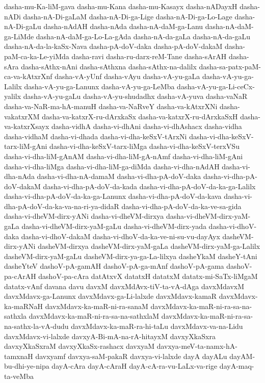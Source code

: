 {dasha-mu-Ka-liM-gava
dasha-mu-Kana
dasha-mu-Kasayx
dasha-nADayxH
dasha-nADi
dasha-nA-Di-gaLaM
dasha-nA-Di-ga-Lige
dasha-nA-Di-ga-Lo-Lage
dasha-nA-Di-gaLu
dasha-nAdAH
dasha-nAda
dasha-nA-daM-ga-Lanu
dasha-nA-daM-ga-LiMde
dasha-nA-daM-ga-Lo-La-gAda
dasha-nA-da-gaLa
dasha-nA-da-gaLu
dasha-nA-da-la-kaSx-Nava
dasha-pA-doV-daka
dasha-pA-doV-dakaM
dasha-paM-ca-ka-Le-yiMda
dasha-ravi
dasha-ru-darx-reM-Tane
dasha-sArAH
dasha-sAra
dasha-sAthx-nAni
dasha-sAthxna
dasha-sAthx-na-dalilx
dasha-sa-patx-paM-ca-va-kAtxrXnf
dasha-vA-yUnf
dasha-vAyu
dasha-vA-yu-gaLa
dasha-vA-yu-ga-Lalilx
dasha-vA-yu-ga-Lanunx
dasha-vA-yu-ga-LeMba
dasha-vA-yu-ga-Li-ceCx-yalilx
dasha-vA-yu-gaLu
dasha-vA-yu-shudadhx
dasha-vA-yuva
dasha-vaNaR
dasha-va-NaR-ma-hA-manuH
dasha-va-NaRveY
dasha-va-kAtxrXNi
dasha-vakatxrXM
dasha-va-katxrX-ru-dArxkaSx
dasha-va-katxrX-ru-dArxkaSxH
dasha-va-katxrXsayx
dasha-vidhA
dasha-vi-dhAni
dasha-vi-dhAshacx
dasha-vidha
dasha-vidhaM
dasha-vi-dhada
dasha-vi-dha-keSxV-tArxNi
dasha-vi-dha-keSxV-tarx-liM-gAni
dasha-vi-dha-keSxV-tarx-liMga
dasha-vi-dha-keSxV-terxVSu
dasha-vi-dha-liM-gAnAM
dasha-vi-dha-liM-gA-nAmf
dasha-vi-dha-liM-gAni
dasha-vi-dha-liMga
dasha-vi-dha-liM-ga-diMda
dasha-vi-dha-nAdAH
dasha-vi-dha-nAda
dasha-vi-dha-nA-damaM
dasha-vi-dha-pA-doV-daka
dasha-vi-dha-pA-doV-dakaM
dasha-vi-dha-pA-doV-da-kada
dasha-vi-dha-pA-doV-da-ka-ga-Lalilx
dasha-vi-dha-pA-doV-da-ka-ga-Lanunx
dasha-vi-dha-pA-doV-da-kava
dasha-vi-dha-pA-doV-da-ka-va-na-ri-ya-didaR
dasha-vi-dha-pA-doV-da-ka-ve-sa-gida
dasha-vi-dheVM-dirx-yANi
dasha-vi-dheVM-dirxya
dasha-vi-dheVM-dirx-yaM-gaLa
dasha-vi-dheVM-dirx-yaM-gaLu
dasha-vi-dheVM-dirx-yada
dasha-vi-dhoV-daka
dasha-vi-dhoV-dakaM
dasha-vi-dhoV-da-ka-ve-ni-su-vu-dayAyx
dasheVM-dirx-yANi
dasheVM-dirxya
dasheVM-dirx-yaM-gaLa
dasheVM-dirx-yaM-ga-Lalilx
dasheVM-dirx-yaM-gaLu
dasheVM-dirx-ya-ga-La-lilxya
dasheYkaM
dasheY-tAni
dasheYteV
dashoV-pA-gamAH
dashoV-pA-ga-mAnf
dashoV-pA-gama
dashoV-pa-cArAH
dashoV-pa-cAra
datAtxvX
datatxH
datatxM
datatx-mi-SaTx-liMgaM
datatx-vAnf
davana
davu
davxM
davxMdAvx-tiV-ta-vA-dAga
davxMdavxM
davxMdavx-ga-Lanunx
davxMdavx-ga-Li-lalxde
davxMdavx-kamaR
davxMdavx-ka-maRNaH
davxMdavx-ka-maR-ni-ra-sanaM
davxMdavx-ka-maR-ni-ra-sa-na-sathxla
davxMdavx-ka-maR-ni-ra-sa-na-sathxlaM
davxMdavx-ka-maR-ni-ra-sa-na-sathx-la-vA-dudu
davxMdavx-ka-maR-ra-hi-taLu
davxMdavx-va-na-Lidu
davxMdavx-vi-lalxde
davxyA-Bi-mA-na-rA-hitayxM
davxyXkaSxra
davxyXkaSxraM
davxyXkaSx-rashacx
davxyaM
davxya-meV-ta-namx-hA-tamxnaH
davxyamf
davxya-saM-pakaR
davxya-vi-lalxde
dayA
dayALu
dayAM-bu-dhi-ye-nipa
dayA-cAra
dayA-cAraH
dayA-cA-ra-vu-LaLx-va-rige
dayA-maq-ta-veMba
}
